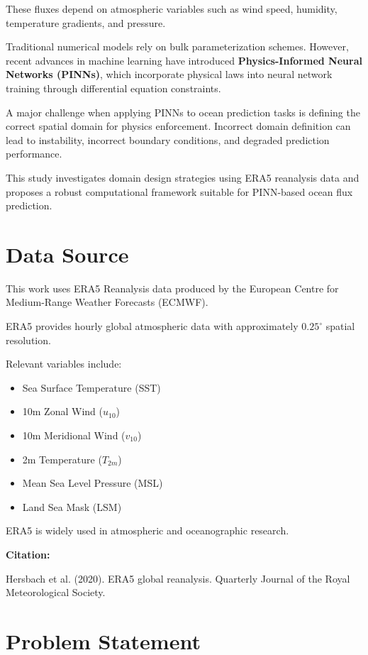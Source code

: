 \documentclass[12pt,a4paper]{article}
\begin{document}
These fluxes depend on atmospheric variables such as wind speed, humidity, temperature gradients, and pressure.

Traditional numerical models rely on bulk parameterization schemes. However, recent advances in machine learning have introduced \textbf{Physics-Informed Neural Networks (PINNs)}, which incorporate physical laws into neural network training through differential equation constraints.

A major challenge when applying PINNs to ocean prediction tasks is defining the correct spatial domain for physics enforcement. Incorrect domain definition can lead to instability, incorrect boundary conditions, and degraded prediction performance.

This study investigates domain design strategies using ERA5 reanalysis data and proposes a robust computational framework suitable for PINN-based ocean flux prediction.

\section{Data Source}

This work uses ERA5 Reanalysis data produced by the European Centre for Medium-Range Weather Forecasts (ECMWF).

ERA5 provides hourly global atmospheric data with approximately $0.25^\circ$ spatial resolution.

Relevant variables include:

\begin{itemize}
\item Sea Surface Temperature (SST)
\item 10m Zonal Wind ($u_{10}$)
\item 10m Meridional Wind ($v_{10}$)
\item 2m Temperature ($T_{2m}$)
\item Mean Sea Level Pressure (MSL)
\item Land Sea Mask (LSM)
\end{itemize}

ERA5 is widely used in atmospheric and oceanographic research.

\textbf{Citation:}

Hersbach et al. (2020). ERA5 global reanalysis. Quarterly Journal of the Royal Meteorological Society.

\section{Problem Statement}
\end{document}
